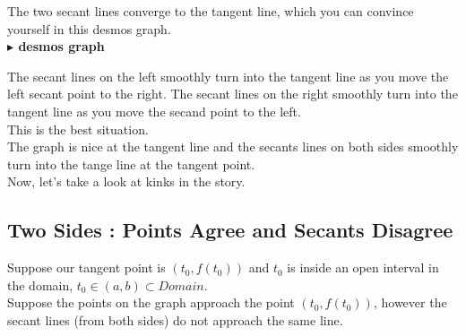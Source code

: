 \documentclass{ximera}
\begin{document}
The two secant lines converge to the tangent line, which you can convince yourself in this desmos graph. \\





\textbf{\textcolor{blue!55!black}{$\blacktriangleright$ desmos graph}} 
\begin{center}
\end{center}







The secant lines on the left smoothly turn into the tangent line as you move the left secant point to the right. The secant lines on the right smoothly turn into the tangent line as you move the secand point to the left. \\



This is the best situation. \\

The graph is nice at the tangent line and the secants lines on both sides smoothly turn into the tange line at the tangent point. \\



Now, let's take a look at kinks in the story. \\





















\subsection*{Two Sides : Points Agree and Secants Disagree}


Suppose our tangent point is $(t_0 , f(t_0))$ and $t_0$ is inside an open interval in the domain, $t_0 \in (a, b) \subset Domain$. \\


Suppose the points on the graph approach the point $(t_0 , f(t_0))$, however the secant lines (from both sides) do not approach the same line.
\end{document}
